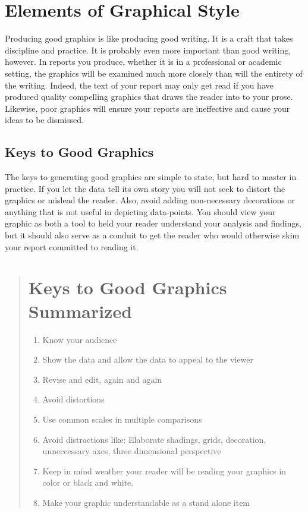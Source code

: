 \documentclass[]{book}
\providecommand{\tightlist}{%
  \setlength{\itemsep}{0pt}\setlength{\parskip}{0pt}}
\theoremstyle{definition}
\theoremstyle{definition}
\theoremstyle{remark}
\begin{document}
\section{Elements of Graphical Style}\label{elements-of-graphical-style}

Producing good graphics is like producing good writing. It is a craft
that takes discipline and practice. It is probably even more important
than good writing, however. In reports you produce, whether it is in a
professional or academic setting, the graphics will be examined much
more closely than will the entirety of the writing. Indeed, the text of
your report may only get read if you have produced quality compelling
graphics that draws the reader into to your prose. Likewise, poor
graphics will ensure your reports are ineffective and cause your ideas
to be dismissed.

\subsection{Keys to Good Graphics}\label{keys-to-good-graphics}

The keys to generating good graphics are simple to state, but hard to
master in practice. If you let the data tell its own story you will not
seek to distort the graphics or mislead the reader. Also, avoid adding
non-necessary decorations or anything that is not useful in depicting
data-points. You should view your graphic as both a tool to held your
reader understand your analysis and findings, but it should also serve
as a conduit to get the reader who would otherwise skim your report
committed to reading it.

\begin{quote}
\section{Keys to Good Graphics
Summarized}\label{keys-to-good-graphics-summarized}

\begin{enumerate}
\def\labelenumi{\arabic{enumi}.}
\tightlist
\item
  Know your audience
\item
  Show the data and allow the data to appeal to the viewer
\item
  Revise and edit, again and again
\item
  Avoid distortions
\item
  Use common scales in multiple comparisons
\item
  Avoid distractions like: Elaborate shadings, grids, decoration,
  unneccessary axes, three dimensional perspective
\item
  Keep in mind weather your reader will be reading your graphics in
  color or black and white.
\item
  Make your graphic understandable as a stand alone item
\end{enumerate}
\end{quote}
\end{document}
